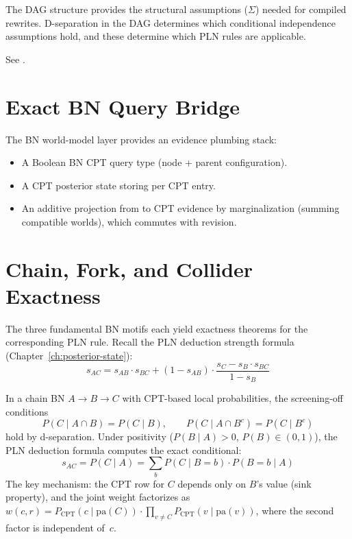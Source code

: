 \documentclass[11pt,openany]{report}
\begin{document}
The DAG structure provides the structural assumptions ($\Sigma$) needed
for compiled rewrites.  D-separation in the DAG determines which
conditional independence assumptions hold, and these determine which
PLN rules are applicable.

See .

\section{Exact BN Query Bridge}

The BN world-model layer provides an evidence plumbing stack:
\begin{itemize}
\item A Boolean BN CPT query type  (node + parent
  configuration).
\item A CPT posterior state  storing \Evidence{} per CPT entry.
\item An additive projection from \JointEvidence{} to CPT evidence by
  marginalization (summing compatible worlds), which commutes with revision.
\end{itemize}

\section{Chain, Fork, and Collider Exactness}

The three fundamental BN motifs each yield exactness theorems for the
corresponding PLN rule.  Recall the PLN deduction strength formula
(Chapter~\ref{ch:posterior-state}):
\[
  s_{AC} = s_{AB} \cdot s_{BC} + (1 - s_{AB}) \cdot
  \frac{s_C - s_B \cdot s_{BC}}{1 - s_B}
\]

\begin{theorem}
\label{thm:chain-exact}
In a chain BN $A \to B \to C$ with CPT-based local probabilities,
the screening-off conditions
\[
  P(C \mid A \cap B) = P(C \mid B), \qquad
  P(C \mid A \cap B^c) = P(C \mid B^c)
\]
hold by d-separation.  Under positivity ($P(B \mid A) > 0$, $P(B) \in (0,1)$),
the PLN deduction formula computes the exact conditional:
\[
  s_{AC} = P(C \mid A) = \sum_b P(C \mid B=b) \cdot P(B=b \mid A)
\]
The key mechanism: the CPT row for $C$ depends only on $B$'s value
(sink property), and the joint weight factorizes as
$w(c, r) = P_{\mathrm{CPT}}(c \mid \mathrm{pa}(C)) \cdot
\prod_{v \ne C} P_{\mathrm{CPT}}(v \mid \mathrm{pa}(v))$,
where the second factor is independent of~$c$.
\end{theorem}
\end{document}

